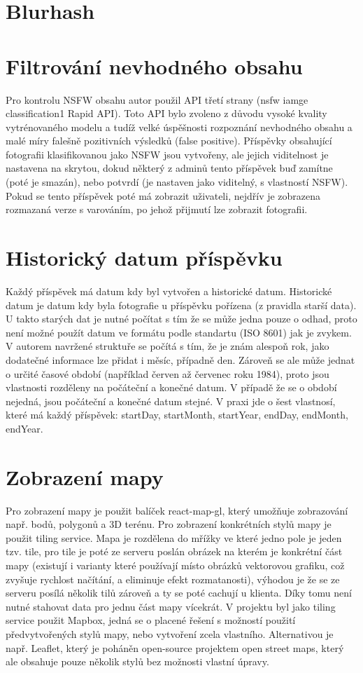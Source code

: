 \documentclass[12pt, a4paper,
 twoside,        %
 openright
]{report}
\begin{document}
\section{Blurhash}


\section{Filtrování nevhodného obsahu}\label{section:nsfw_filter}
Pro kontrolu NSFW obsahu autor použil API třetí strany (nsfw iamge classification1 Rapid API). Toto API bylo zvoleno z důvodu vysoké kvality vytrénovaného modelu a tudíž velké úspěšnosti rozpoznání nevhodného obsahu a malé míry falešně pozitivních výsledků (false positive). Příspěvky obsahující fotografii klasifikovanou jako NSFW jsou vytvořeny, ale jejich viditelnost je nastavena na skrytou, dokud některý z adminů tento příspěvek buď zamítne (poté je smazán), nebo potvrdí (je nastaven jako viditelný, s vlastností NSFW). Pokud se tento příspěvek poté má zobrazit uživateli, nejdřív je zobrazena rozmazaná verze s varováním, po jehož přijmutí lze zobrazit fotografii.

\section{Historický datum příspěvku}\label{section:historica_date}
Každý příspěvek má datum kdy byl vytvořen a historické datum. Historické datum je datum kdy byla fotografie u příspěvku pořízena (z pravidla starší data). U takto starých dat je nutné počítat s tím že se může jedna pouze o odhad, proto není možné použít datum ve formátu podle standartu (ISO 8601) jak je zvykem. V autorem navržené struktuře se počítá s tím, že je znám alespoň rok, jako dodatečné informace lze přidat i měsíc, případně den. Zároveň se ale může jednat o určité časové období (například červen až červenec roku 1984), proto jsou vlastnosti rozděleny na počáteční a konečné datum. V případě že se o období nejedná, jsou počáteční a konečné datum stejné. V praxi jde o šest vlastnosí, které má každý příspěvek: startDay, startMonth, startYear, endDay, endMonth, endYear.

\section{Zobrazení mapy}
    Pro zobrazení mapy je použit balíček react-map-gl, který umožňuje zobrazování např. bodů, polygonů a 3D terénu. Pro zobrazení konkrétních stylů mapy je použit tiling service. Mapa je rozdělena do mřížky ve které jedno pole je jeden tzv. tile, pro tile je poté ze serveru poslán obrázek na kterém je konkrétní část mapy (existují i varianty které používají místo obrázků vektorovou grafiku, což zvyšuje rychlost načítání, a eliminuje efekt rozmatanosti), výhodou je že se ze serveru posílá několik tilů zároveň a ty se poté cachují u klienta. Díky tomu není nutné stahovat data pro jednu část mapy vícekrát. V projektu byl jako tiling service použit Mapbox, jedná se o placené řešení s možností použití předvytvořených stylů mapy, nebo vytvoření zcela vlastního. Alternativou je např. Leaflet, který je poháněn open-source projektem open street maps, který ale obsahuje pouze několik stylů bez možnosti vlastní úpravy.
\end{document}
